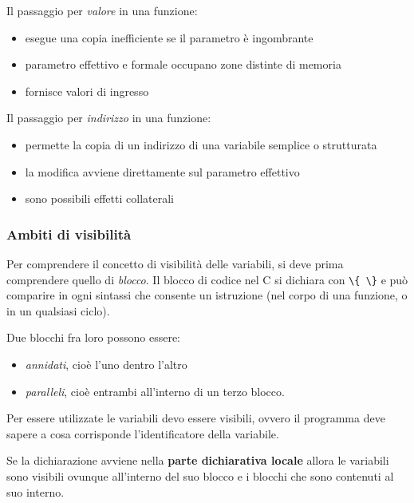 \documentclass[
  paper=a4,
  oneside  ,captions=tableheading
]{scrbook}
\newcommand{\passthrough}[1]{#1}
\providecommand{\tightlist}{%
  \setlength{\itemsep}{0pt}\setlength{\parskip}{0pt}}
\begin{document}
Il passaggio per \emph{valore} in una funzione:

\begin{itemize}
\tightlist
\item
  esegue una copia inefficiente se il parametro è ingombrante
\item
  parametro effettivo e formale occupano zone distinte di memoria
\item
  fornisce valori di ingresso
\end{itemize}

Il passaggio per \emph{indirizzo} in una funzione:

\begin{itemize}
\tightlist
\item
  permette la copia di un indirizzo di una variabile semplice o
  strutturata
\item
  la modifica avviene direttamente sul parametro effettivo
\item
  sono possibili effetti collaterali
\end{itemize}

\hypertarget{ambiti-di-visibilituxe0}{%
\subsubsection{Ambiti di visibilità}\label{ambiti-di-visibilituxe0}}

Per comprendere il concetto di visibilità delle variabili, si deve prima
comprendere quello di \emph{blocco}. Il blocco di codice nel C si
dichiara con \passthrough{\lstinline!\{ \}!} e può comparire in ogni
sintassi che consente un istruzione (nel corpo di una funzione, o in un
qualsiasi ciclo).

Due blocchi fra loro possono essere:

\begin{itemize}
\tightlist
\item
  \emph{annidati}, cioè l'uno dentro l'altro
\item
  \emph{paralleli}, cioè entrambi all'interno di un terzo blocco.
\end{itemize}

Per essere utilizzate le variabili devo essere visibili, ovvero il
programma deve sapere a cosa corrisponde l'identificatore della
variabile.

Se la dichiarazione avviene nella \textbf{parte dichiarativa locale}
allora le variabili sono visibili ovunque all'interno del suo blocco e i
blocchi che sono contenuti al suo interno.
\end{document}

